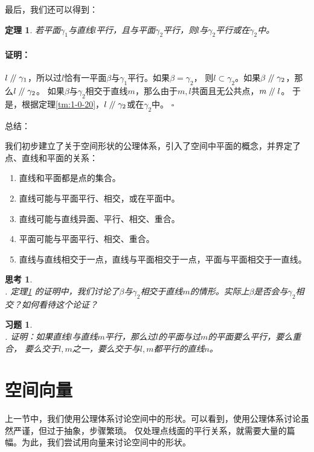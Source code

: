 \documentclass[12pt,UTF8]{ctexbook}
\newtheorem{tm}{定理}[section]
\renewenvironment{proof}{\paragraph{\textbf{证明：}}}{\hfill$\square$}
\newtheorem{sk}{思考}[section]
\renewcommand\parallel{\mathrel{/\mskip-4mu/}}
\newtheorem{xt}{习题}[section]
\begin{document}
最后，我们还可以得到：
\begin{tm}\label{tm:1-0-100}
    若平面$\gamma_1$与直线$l$平行，且与平面$\gamma_2$平行，则$l$与$\gamma_2$平行或在$\gamma_2$中。
\end{tm}
\begin{proof}
    $l\parallel \gamma_1$，所以过$l$恰有一平面$\beta$与$\gamma_1$平行。如果$\beta=\gamma_2$，
    则$l\subset\gamma_2$。如果$\beta\parallel\gamma_2$，那么$l\parallel \gamma_2$。
    如果$\beta$与$\gamma_2$相交于直线$m$，那么由于$m,l$共面且无公共点，$m\parallel l$。
    于是，根据定理\ref{tm:1-0-20}，$l\parallel \gamma_2$或在$\gamma_2$中。
\end{proof}

总结：

我们初步建立了关于空间形状的公理体系，引入了空间中平面的概念，并界定了点、直线和平面的关系：
\begin{enumerate}
    \item 直线和平面都是点的集合。
    \item 直线可能与平面平行、相交，或在平面中。
    \item 直线可能与直线异面、平行、相交、重合。
    \item 平面可能与平面平行、相交、重合。
    \item 直线与直线相交于一点，直线与平面相交于一点，平面与平面相交于一直线。
\end{enumerate}


\begin{sk}
    \mbox{} \\
    . 定理\ref{tm:1-0-100} 的证明中，我们讨论了$\beta$与$\gamma_2$相交于直线$m$的情形。实际上$\beta$是否会与$\gamma_2$相交？如何看待这个论证？
\end{sk}

\begin{xt}
    \mbox{} \\
    . 证明：如果直线$l$与直线$m$平行，那么过$l$的平面与过$m$的平面要么平行，要么重合，
    要么交于$l,m$之一，要么交于与$l,m$都平行的直线$n$。 
\end{xt}


\section{空间向量}

上一节中，我们使用公理体系讨论空间中的形状。可以看到，使用公理体系讨论虽然严谨，但过于抽象，步骤繁琐。
仅处理点线面的平行关系，就需要大量的篇幅。为此，我们尝试用向量来讨论空间中的形状。
\end{document}
